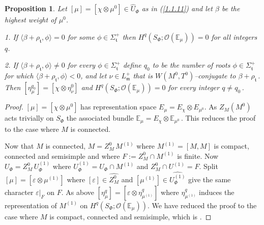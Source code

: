 \documentclass{conm-p-l}
\newtheorem{proposition}[equation]{Proposition}
\newcommand{\cO}{\mathcal{O}}
\def\gm{\mathfrak{m}}
\def\gt{\mathfrak{t}}
\def\E{\mathbb{E}}
\def\cO{\mathcal{O}}
\begin{document}
\begin{proposition}\label{1.1.12}
Let $[\mu] = [\chi\otimes\mu^0] \in \widehat{U}_\Phi$ as in 
{\rm (\ref{1.1.11})} and let $\beta$ be the highest weight of $\mu^0$.

\noindent
{\rm 1.} If $\langle \beta + \rho_\gt,\phi \rangle = 0$ for some 
$\phi \in \Sigma_\gt^+$ then $H^q(S_\Phi;\cO(\E_\mu)) = 0$ for all integers $q$.

\noindent
{\rm 2.} If $\langle \beta + \rho_\gt,\phi \rangle \ne 0$ for every
$\phi \in \Sigma_\gt^+$ define $q_0$ to be the number of roots $\phi \in 
\Sigma_\gt^+$ for which $\langle \beta + \rho_\gt,\phi \rangle < 0$, and
let $\nu \in L_\gm^+$ that is $W(M^0,T^0)$--conjugate to $\beta + \rho_\gt$\,.
Then $[\eta_\mu^{q_0}] = [\chi\otimes \eta_\nu^0]$ and
$H^q(S_\Phi;\cO(\E_\mu)) = 0$ for every integer $q \ne q_0$\,.
\end{proposition}

\begin{proof} $[\mu] = [\chi\otimes\mu^0]$ has representation space
$E_\mu = E_\chi \otimes E_{\mu^0}$.  As $Z_M(M^0)$ acts trivially on $S_\Phi$ 
the associated bundle $\E_\mu = E_\chi \otimes \E_{\mu^0}$\,.  This reduces 
the proof to the case where $M$ is connected.

Now that $M$ is connected, $M = Z_M^0\,M^{(1)}$ where $M^{(1)} = [M,M]$
is compact, connected and semisimple and where $F:= Z_M^0\cap M^{(1)}$
is finite.  Now $U_\Phi = Z_M^0\, U_\Phi^{(1)}$ where $U_\Phi^{(1)} =
U_\Phi\cap M^{(1)}$ and $Z_M^0\cap U^{(1)} = F$.  Split 
$[\mu] = [\varepsilon \otimes \mu^{(1)}]$  where $[\varepsilon] \in 
\widehat{Z_M^0}$ and $[\mu^{(1)}] \in \widehat{U_\Phi^{(1)}}$ give the same
character $\varepsilon|_F$ on $F$.  As above 
$[\eta_\mu^q] = [\varepsilon \otimes \eta_{\mu^{(1)}}^q]$ where
$\eta_{\mu^{(1)}}^q$ induces the representation of $M^{(1)}$ on
$H^q(S_\Phi;\cO(\E_\mu))$.  We have reduced the proof to the case where
$M$ is compact, connected and semisimple, which is \cite{B1957}.
\end{proof}
\end{document}
